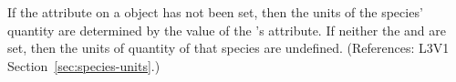 If the  attribute on a \Species object has not been
set, then the units of the species' quantity are determined by the value of
the \Model's  attribute.  If neither the \Species
{} and \Model {} are set, then the
units of quantity of that species are undefined.  (References: L3V1
Section~\ref{sec:species-units}.)
